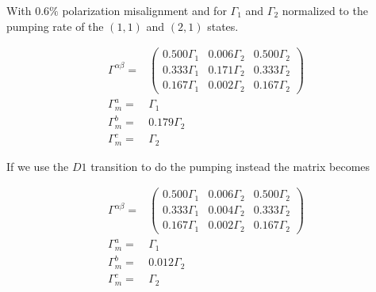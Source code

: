 \documentclass[10pt,fleqn]{article}
\newcommand{\eqar}[1]
{
  \begin{align*}
    #1
  \end{align*}
}
\begin{document}
With $0.6\%$ polarization misalignment and for $\Gamma_1$ and $\Gamma_2$ normalized to the pumping rate of the $(1, 1)$ and $(2, 1)$ states.
\eqar{
  \Gamma^{\alpha\beta}=&\begin{pmatrix}
    0.500\Gamma_1&0.006\Gamma_2&0.500\Gamma_2\\
    0.333\Gamma_1&0.171\Gamma_2&0.333\Gamma_2\\
    0.167\Gamma_1&0.002\Gamma_2&0.167\Gamma_2
  \end{pmatrix}\\
  \Gamma^a_m=&\Gamma_1\\
  \Gamma^b_m=&0.179\Gamma_2\\
  \Gamma^c_m=&\Gamma_2
}
If we use the $D1$ transition to do the pumping instead the matrix becomes
\eqar{
  \Gamma^{\alpha\beta}=&\begin{pmatrix}
    0.500\Gamma_1&0.006\Gamma_2&0.500\Gamma_2\\
    0.333\Gamma_1&0.004\Gamma_2&0.333\Gamma_2\\
    0.167\Gamma_1&0.002\Gamma_2&0.167\Gamma_2
  \end{pmatrix}\\
  \Gamma^a_m=&\Gamma_1\\
  \Gamma^b_m=&0.012\Gamma_2\\
  \Gamma^c_m=&\Gamma_2
}
\end{document}
